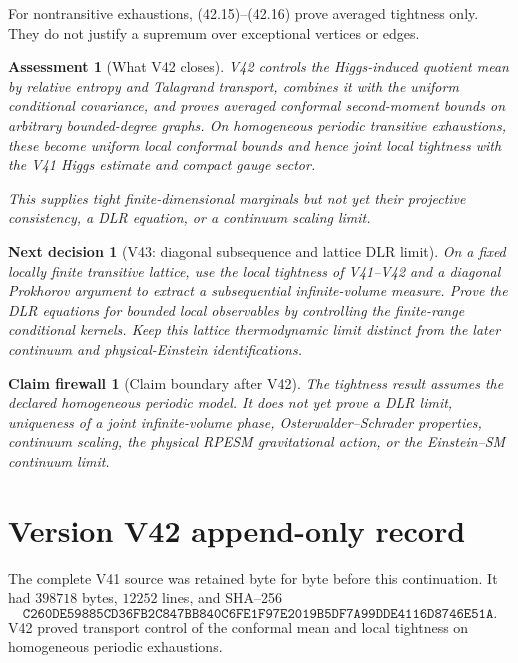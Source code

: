 \documentclass[11pt]{article}
\newtheorem{firewall}[theorem]{Claim firewall}
\newtheorem{decision}[theorem]{Next decision}
\newtheorem{assessment}[theorem]{Assessment}
\theoremstyle{remark}
\begin{document}
For nontransitive exhaustions, (42.15)--(42.16) prove averaged tightness
only.  They do not justify a supremum over exceptional vertices or
edges.

\begin{assessment}[What V42 closes]
\label{ass:v17v42-status}
V42 controls the Higgs-induced quotient mean by relative entropy and
Talagrand transport, combines it with the uniform conditional covariance,
and proves averaged conformal second-moment bounds on arbitrary
bounded-degree graphs.  On homogeneous periodic transitive exhaustions,
these become uniform local conformal bounds and hence joint local
tightness with the V41 Higgs estimate and compact gauge sector.

This supplies tight finite-dimensional marginals but not yet their
projective consistency, a DLR equation, or a continuum scaling limit.
\end{assessment}

\begin{decision}[V43: diagonal subsequence and lattice DLR limit]
\label{dec:v17v42-next}
On a fixed locally finite transitive lattice, use the local tightness of
V41--V42 and a diagonal Prokhorov argument to extract a subsequential
infinite-volume measure.  Prove the DLR equations for bounded local
observables by controlling the finite-range conditional kernels.  Keep
this lattice thermodynamic limit distinct from the later continuum and
physical-Einstein identifications.
\end{decision}

\begin{firewall}[Claim boundary after V42]
\label{fire:v17v42}
The tightness result assumes the declared homogeneous periodic model.
It does not yet prove a DLR limit, uniqueness of a joint infinite-volume
phase, Osterwalder--Schrader properties, continuum scaling, the physical
RPESM gravitational action, or the Einstein--SM continuum limit.
\end{firewall}

\section*{Version V42 append-only record}
The complete V41 source was retained byte for byte before this
continuation.  It had \(398718\) bytes, \(12252\) lines, and SHA--256
\[
 \texttt{C260DE59885CD36FB2C847BB840C6FE1F97E2019B5DF7A99DDE4116D8746E51A}.
\]
V42 proved transport control of the conformal mean and local tightness
on homogeneous periodic exhaustions.
\end{document}
